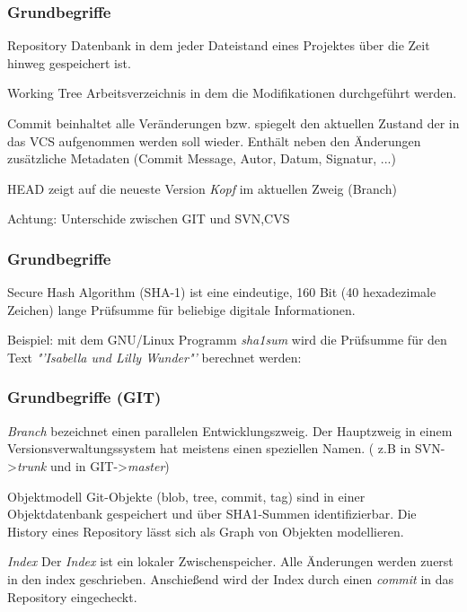 \documentclass{beamer}
\begin{document}
\begin{frame}\frametitle{Grundbegriffe}
\begin{block}{Repository}
Datenbank in dem jeder Dateistand eines Projektes über die Zeit hinweg gespeichert ist.
\end{block}
\begin{block}{Working Tree}
Arbeitsverzeichnis in dem die Modifikationen durchgeführt werden.
\end{block}
\begin{block}{Commit}
beinhaltet alle Veränderungen bzw. spiegelt den aktuellen Zustand der in das VCS aufgenommen werden soll wieder. Enthält neben den Änderungen zusätzliche Metadaten (Commit Message, Autor, Datum, Signatur, ...)
\end{block}
\begin{block}{HEAD}
zeigt auf die neueste Version \textit{Kopf} im aktuellen Zweig (Branch)

Achtung: Unterschide zwischen GIT und SVN,CVS
\end{block}
\end{frame}

\begin{frame}\frametitle{Grundbegriffe}
\begin{block}{Secure Hash Algorithm (SHA-1)}
ist eine eindeutige, 160 Bit (40 hexadezimale Zeichen) lange Prüfsumme für beliebige digitale Informationen.
\end{block}
\begin{exampleblock}{Beispiel:}
mit dem GNU/Linux Programm \textit{sha1sum} wird die Prüfsumme für den Text \textit{"'Isabella und Lilly Wunder"'} berechnet werden:

\end{exampleblock}
\end{frame}

\begin{frame}\frametitle{Grundbegriffe (GIT)}
\begin{block}{\textit{Branch}}
bezeichnet einen parallelen Entwicklungszweig. Der Hauptzweig in einem Versionsverwaltungssystem hat meistens einen speziellen Namen. ( z.B in SVN->\textit{trunk} und in GIT->\textit{master})
\end{block}
\begin{block}{Objektmodell}
Git-Objekte (blob, tree, commit, tag) sind in einer Objektdatenbank gespeichert und über SHA1-Summen identifizierbar. Die History eines Repository lässt sich als Graph von Objekten modellieren.
\end{block}
\begin{block}{\textit{Index}}
Der \textit{Index} ist ein lokaler Zwischenspeicher. Alle Änderungen werden zuerst in den index geschrieben. Anschießend wird der Index durch einen \textit{commit} in das Repository eingecheckt. 
\end{block}
\end{frame}
\end{document}

